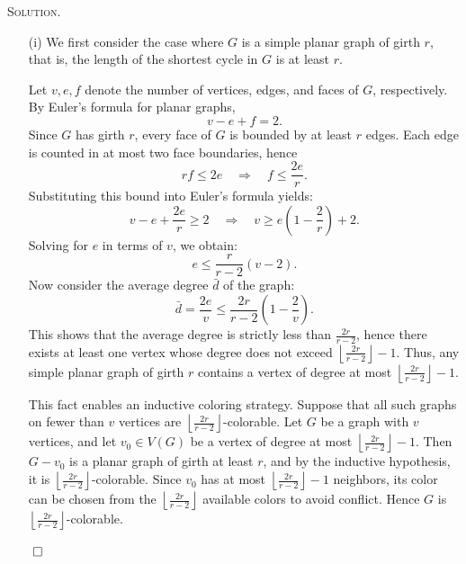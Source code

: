 \documentclass[12pt, a4paper, oneside]{ctexart}
\newenvironment{solution}{%
	\par\noindent\textsc{Solution. }\ignorespaces
}{%
	\hfill$\qed$\par
}
\begin{document}
	\begin{solution}
     
         \begin{itemize}
            \item[(i)] 
					We first consider the case where \( G \) is a simple planar graph of girth \( r \), 
					that is, the length of the shortest cycle in \( G \) is at least \( r \). 

					Let \( v, e, f \) denote the number of vertices, edges, and faces of \( G \), 
					respectively. By Euler’s formula for planar graphs,
					\[
					v - e + f = 2.
					\]
					Since \( G \) has girth \( r \), every face of \( G \) is bounded by at least \( r \) edges. 
					Each edge is counted in at most two face boundaries, hence
					\[
					rf \leq 2e \quad \Rightarrow \quad f \leq \frac{2e}{r}.
					\]
					Substituting this bound into Euler’s formula yields:
					\[
					v - e + \frac{2e}{r} \geq 2 \quad \Rightarrow \quad v \geq e \left(1 - \frac{2}{r}\right) + 2.
					\]
					Solving for \( e \) in terms of \( v \), we obtain:
					\[
					e \leq \frac{r}{r - 2}(v - 2).
					\]
					Now consider the average degree \( \bar{d} \) of the graph:
					\[
					\bar{d} = \frac{2e}{v} \leq \frac{2r}{r - 2} \left(1 - \frac{2}{v}\right).
					\]
					This shows that the average degree is strictly less than \( \frac{2r}{r - 2} \), 
					hence there exists at least one vertex whose degree does not exceed 
					\( \left\lfloor \frac{2r}{r - 2} \right\rfloor -1\). Thus, any simple planar graph of girth 
					\( r \) contains a vertex of degree at most \( \left\lfloor \frac{2r}{r - 2} \right\rfloor - 1 \).

					This fact enables an inductive coloring strategy. Suppose that all such graphs on fewer than 
					\( v \) vertices are \( \left\lfloor \frac{2r}{r - 2} \right\rfloor \)-colorable. 
					Let \( G \) be a graph with \( v \) vertices, and let \( v_0 \in V(G) \) be a vertex of degree 
					at most \( \left\lfloor \frac{2r}{r - 2} \right\rfloor - 1\). Then \( G - v_0 \) is a planar graph 
					of girth at least \( r \), and by the inductive hypothesis, it is 
					\( \left\lfloor \frac{2r}{r - 2} \right\rfloor \)-colorable. Since \( v_0 \) has at most 
					\( \left\lfloor \frac{2r}{r - 2} \right\rfloor -1 \) neighbors, its color can be chosen from the 
					\( \left\lfloor \frac{2r}{r - 2} \right\rfloor \) available colors to avoid conflict. 
					Hence \( G \) is \( \left\lfloor \frac{2r}{r - 2} \right\rfloor \)-colorable.


\end{itemize}
\end{solution}
\end{document}
